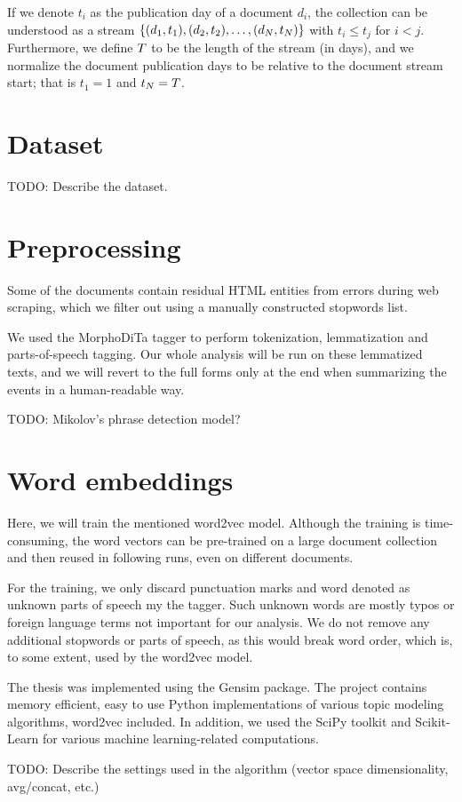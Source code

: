 If we denote $t_{i}$ as the publication day of a document $d_{i}$, the collection can be understood as a stream $\left\{ (d_{1}, t_{1}), (d_{2}, t_{2}), \dots, (d_{N}, t_{N}) \right\}$ with $t_{i} \leq t_{j}$ for $i < j$. Furthermore, we define $T$ to be the length of the stream (in days), and we normalize the document publication days to be relative to the document stream start; that is $t_{1} = 1$ and $t_{N} = T$.


\section{Dataset}
{\color{red} TODO: Describe the dataset.}


\section{Preprocessing}
Some of the documents contain residual HTML entities from errors during web scraping, which we filter out using a manually constructed stopwords list.

We used the MorphoDiTa tagger \cite{morphodita} to perform tokenization, lemmatization and parts-of-speech tagging. Our whole analysis will be run on these lemmatized texts, and we will revert to the full forms only at the end when summarizing the events in a human-readable way.

{\color{red} TODO: Mikolov's phrase detection model?}


\section{Word embeddings} \label{word-embeddings}
Here, we will train the mentioned word2vec model. Although the training is time-consuming, the word vectors can be pre-trained on a large document collection and then reused in following runs, even on different documents.

For the training, we only discard punctuation marks and word denoted as unknown parts of speech my the tagger. Such unknown words are mostly typos or foreign language terms not important for our analysis. We do not remove any additional stopwords or parts of speech, as this would break word order, which is, to some extent, used by the word2vec model.

The thesis was implemented using the Gensim \cite{gensim} package. The project contains memory efficient, easy to use Python implementations of various topic modeling algorithms, word2vec included. In addition, we used the SciPy toolkit \cite{scipy} and Scikit-Learn \cite{scikit-learn} for various machine learning-related computations.

{\color{red} TODO: Describe the settings used in the algorithm (vector space dimensionality, avg/concat, etc.)}